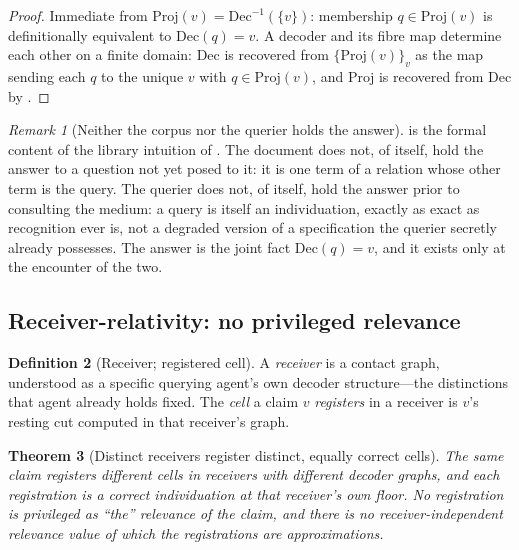 \documentclass[11pt,twocolumn,a4paper]{article}
\theoremstyle{frathm}
\newtheorem{theorem}{Theorem}[section]
\theoremstyle{definition}
\newtheorem{definition}[theorem]{Definition}
\theoremstyle{remark}
\newtheorem{remark}[theorem]{Remark}
\begin{document}
\begin{proof}
Immediate from $\mathrm{Proj}(v)=\mathrm{Dec}^{-1}(\{v\})$: membership
$q\in\mathrm{Proj}(v)$ is definitionally equivalent to $\mathrm{Dec}(q)=v$.
A decoder and its fibre map determine each other on a finite domain:
$\mathrm{Dec}$ is recovered from $\{\mathrm{Proj}(v)\}_v$ as the map
sending each $q$ to the unique $v$ with $q\in\mathrm{Proj}(v)$, and
$\mathrm{Proj}$ is recovered from $\mathrm{Dec}$ by .
\end{proof}

\begin{remark}[Neither the corpus nor the querier holds the answer]
\label{rem:library}
 is the formal content of the library
intuition of . The document does not, of itself, hold the
answer to a question not yet posed to it: it is one term of a relation
whose other term is the query. The querier does not, of itself, hold the
answer prior to consulting the medium: a query is itself an
individuation, exactly as exact as recognition ever is, not a degraded
version of a specification the querier secretly already possesses. The
answer is the joint fact $\mathrm{Dec}(q)=v$, and it exists only at the
encounter of the two.
\end{remark}

\subsection{Receiver-relativity: no privileged relevance}

\begin{definition}[Receiver; registered cell]
\label{def:receiver}
A \emph{receiver} is a contact graph, understood as a specific querying
agent's own decoder structure---the distinctions that agent already holds
fixed. The \emph{cell} a claim $v$ \emph{registers} in a receiver is $v$'s
resting cut computed in that receiver's graph.
\end{definition}

\begin{theorem}[Distinct receivers register distinct, equally correct
cells]
\label{thm:receiver}
The same claim registers different cells in receivers with different
decoder graphs, and each registration is a correct individuation at that
receiver's own floor. No registration is privileged as ``the'' relevance
of the claim, and there is no receiver-independent relevance value of
which the registrations are approximations.
\end{theorem}
\end{document}
